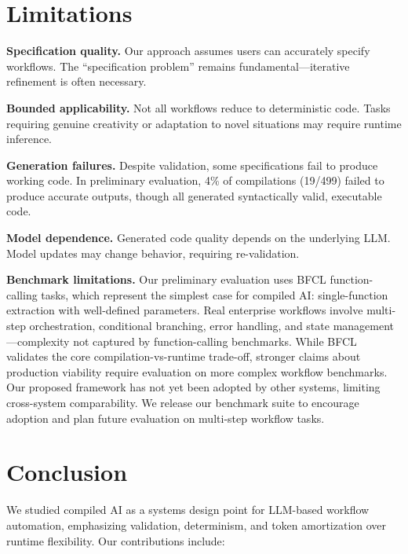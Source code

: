 \documentclass[11pt]{article}
\begin{document}
\section{Limitations}
\label{sec:limitations}

\textbf{Specification quality.} Our approach assumes users can accurately specify workflows. The ``specification problem'' remains fundamental---iterative refinement is often necessary.

\textbf{Bounded applicability.} Not all workflows reduce to deterministic code. Tasks requiring genuine creativity or adaptation to novel situations may require runtime inference.

\textbf{Generation failures.} Despite validation, some specifications fail to produce working code. In preliminary evaluation, 4\% of compilations (19/499) failed to produce accurate outputs, though all generated syntactically valid, executable code.

\textbf{Model dependence.} Generated code quality depends on the underlying LLM. Model updates may change behavior, requiring re-validation.

\textbf{Benchmark limitations.} Our preliminary evaluation uses BFCL function-calling tasks, which represent the simplest case for compiled AI: single-function extraction with well-defined parameters. Real enterprise workflows involve multi-step orchestration, conditional branching, error handling, and state management---complexity not captured by function-calling benchmarks. While BFCL validates the core compilation-vs-runtime trade-off, stronger claims about production viability require evaluation on more complex workflow benchmarks. Our proposed framework has not yet been adopted by other systems, limiting cross-system comparability. We release our benchmark suite to encourage adoption and plan future evaluation on multi-step workflow tasks.

\section{Conclusion}
\label{sec:conclusion}

We studied compiled AI as a systems design point for LLM-based workflow automation, emphasizing validation, determinism, and token amortization over runtime flexibility. Our contributions include:
\end{document}
